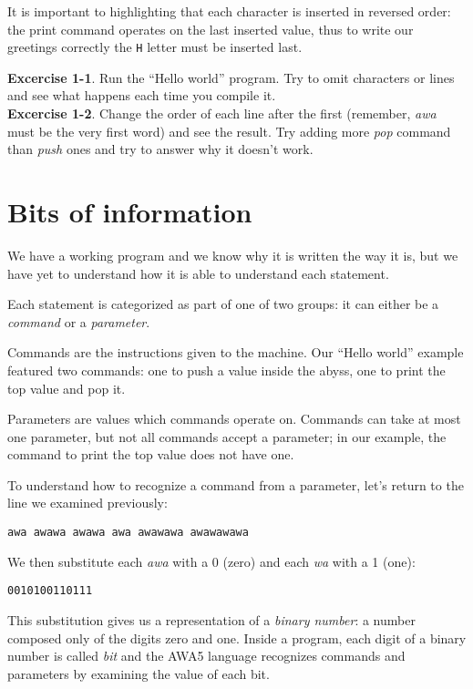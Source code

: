 \documentclass[11pt,a4paper,draft]{book}
\begin{document}
It is important to highlighting that each character is inserted in
reversed order: the print command operates on the last inserted value,
thus to write our greetings correctly the \verb|H| letter must be
inserted last.

\textbf{Excercise 1-1}. Run the \enquote{Hello world} program. Try to
omit characters or lines and see what happens each time you compile
it. \\
\textbf{Excercise 1-2}. Change the order of each line after the first
(remember, \emph{awa} must be the very first word) and see the
result. Try adding more \emph{pop} command than \emph{push} ones and
try to answer why it doesn't work.

\section{Bits of information}
We have a working program and we know why it is written the way it is,
but we have yet to understand how it is able to understand each
statement.

Each statement is categorized as part of one of two groups: it can
either be a \emph{command} or a \emph{parameter}.

Commands are the instructions given to the machine. Our \enquote{Hello
  world} example featured two commands: one to push a value inside the
abyss, one to print the top value and pop it.

Parameters are values which commands operate on. Commands can take at
most one parameter, but not all commands accept a parameter; in our
example, the command to print the top value does not have one.

To understand how to recognize a command from a parameter, let's
return to the line we examined previously:
\begin{verbatim}
awa awawa awawa awa awawawa awawawawa
\end{verbatim}

We then substitute each \emph{awa} with a 0 (zero) and each \emph{wa}
with a 1 (one):
\begin{verbatim}
0010100110111
\end{verbatim}

This substitution gives us a representation of a \emph{binary number}:
a number composed only of the digits zero and one. Inside a program,
each digit of a binary number is called \emph{bit} and the AWA5
language recognizes commands and parameters by examining the value of
each bit.
\end{document}
